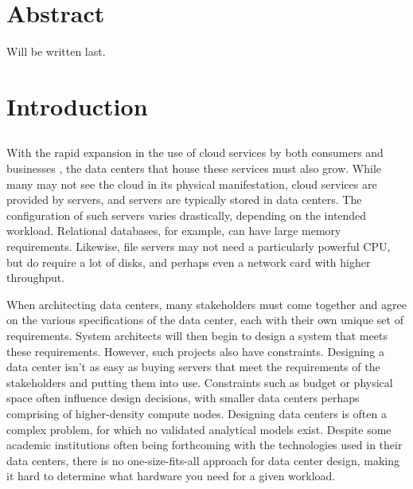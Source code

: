 \documentclass[11pt]{article}
\begin{document}
\newpage

\tableofcontents
\newpage
\listoffigures
\listoftables
\newpage


\section*{Abstract}
Will be written last.
\newpage

\section{Introduction} \label{sec:introduction}
	
	\subsection{\opendc{}}
		With the rapid expansion in the use of cloud services by both consumers and businesses \cite{Kushida2015}\cite{mokhtar2013}, the data centers that house these services must also grow. 
		While many may not see the cloud in its physical manifestation, cloud services are provided by servers, and servers are typically stored in data centers. 
		The configuration of such servers varies drastically, depending on the intended workload. 
		Relational databases, for example, can have large memory requirements. 
		Likewise, file servers may not need a particularly powerful CPU, but do require a lot of disks, and perhaps even a network card with higher throughput.

		When architecting data centers, many stakeholders must come together and agree on the various specifications of the data center, each with their own unique set of requirements. 
		System architects will then begin to design a system that meets these requirements. 
		However, such projects also have constraints. 
		Designing a data center isn't as easy as buying servers that meet the requirements of the stakeholders and putting them into use. 
		Constraints such as budget or physical space often influence design decisions, with smaller data centers perhaps comprising of higher-density compute nodes. 
		Designing data centers is often a complex problem, for which no validated analytical models exist. 
		Despite some academic institutions often being forthcoming with the technologies used in their data centers, there is no one-size-fits-all approach for data center design, making it hard to determine what hardware you need for a given workload.
		
\end{document}
